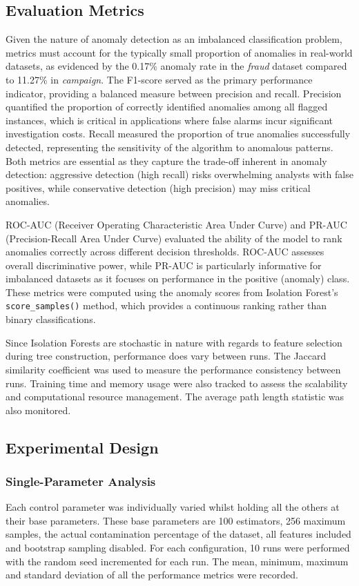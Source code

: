 \documentclass[10pt, conference]{IEEEtran}
\begin{document}
\subsection{Evaluation Metrics}
Given the nature of anomaly detection as an imbalanced classification problem, metrics must account for the typically small proportion of anomalies in real-world datasets, as evidenced by the 0.17\% anomaly rate in the \textit{fraud} dataset compared to 11.27\% in \textit{campaign}. The F1-score served as the primary performance indicator, providing a balanced measure between precision and recall. Precision quantified the proportion of correctly identified anomalies among all flagged instances, which is critical in applications where false alarms incur significant investigation costs. Recall measured the proportion of true anomalies successfully detected, representing the sensitivity of the algorithm to anomalous patterns. Both metrics are essential as they capture the trade-off inherent in anomaly detection: aggressive detection (high recall) risks overwhelming analysts with false positives, while conservative detection (high precision) may miss critical anomalies.

ROC-AUC (Receiver Operating Characteristic Area Under Curve) and PR-AUC (Precision-Recall Area Under Curve) evaluated the ability of the model to rank anomalies correctly across different decision thresholds. ROC-AUC assesses overall discriminative power, while PR-AUC is particularly informative for imbalanced datasets as it focuses on performance in the positive (anomaly) class. These metrics were computed using the anomaly scores from Isolation Forest's \texttt{score\_samples()} method, which provides a continuous ranking rather than binary classifications.

Since Isolation Forests are stochastic in nature with regards to feature selection during tree construction, performance does vary between runs. The Jaccard similarity coefficient was used to measure the performance consistency between runs. Training time and memory usage were also tracked to assess the scalability and computational resource management. The average path length statistic was also monitored.
\subsection{Experimental Design}
\subsubsection{Single-Parameter Analysis}
Each control parameter was individually varied whilst holding all the others at their base parameters. These base parameters are 100 estimators, 256 maximum samples, the actual contamination percentage of the dataset, all features included and bootstrap sampling disabled. For each configuration, 10 runs were performed with the random seed incremented for each run. The mean, minimum, maximum and standard deviation of all the performance metrics were recorded.
\end{document}
